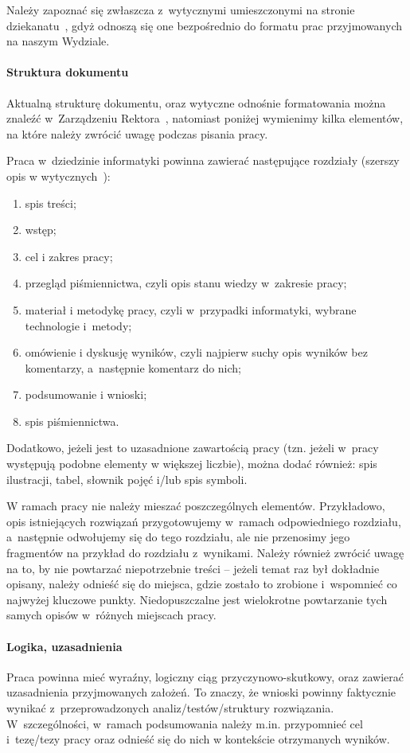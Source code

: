 Należy zapoznać się zwłaszcza z~wytycznymi umieszczonymi na stronie dziekanatu~, gdyż 
odnoszą się one bezpośrednio do formatu prac przyjmowanych na naszym Wydziale. 


\paragraph{Struktura dokumentu}
\label{sec:dod:struktura}
Aktualną strukturę dokumentu, oraz wytyczne odnośnie formatowania można znaleźć w~Zarządzeniu Rektora~, natomiast poniżej wymienimy kilka elementów, na które należy zwrócić uwagę podczas pisania pracy.

Praca w~dziedzinie informatyki powinna zawierać następujące rozdziały (szerszy opis w wytycznych~):\pagebreak[2]
\begin{enumerate}
\item spis treści;  
\item wstęp;  
\item cel i zakres pracy;  
\item przegląd piśmiennictwa, czyli opis stanu wiedzy w~zakresie pracy;
\item materiał i metodykę pracy, czyli w~przypadki informatyki, wybrane technologie i~metody;
\item omówienie i dyskusję wyników, czyli najpierw suchy opis wyników bez komentarzy, a~następnie komentarz do nich;
\item podsumowanie i wnioski; 
\item spis piśmiennictwa. 
\end{enumerate}
Dodatkowo, jeżeli jest to uzasadnione zawartością pracy (tzn. jeżeli w~pracy występują podobne elementy w większej liczbie), można dodać również: spis ilustracji, tabel, słownik pojęć i/lub spis symboli. 

W ramach pracy nie należy mieszać poszczególnych elementów. Przykładowo, opis istniejących rozwiązań przygotowujemy w~ramach odpowiedniego rozdziału, a~następnie odwołujemy się do tego rozdziału, ale nie przenosimy jego fragmentów na przykład do rozdziału z~wynikami. Należy również zwrócić uwagę na to, by nie powtarzać niepotrzebnie treści -- jeżeli temat raz był dokładnie opisany, należy odnieść się do miejsca, gdzie zostało to zrobione i~wspomnieć co najwyżej kluczowe punkty. Niedopuszczalne jest wielokrotne powtarzanie tych samych opisów w~różnych miejscach pracy.


\paragraph{Logika, uzasadnienia}
\label{sec:dod:logika-uzasadnienia}
Praca powinna mieć wyraźny, logiczny ciąg przyczynowo-skutkowy, oraz zawierać uzasadnienia 
przyjmowanych założeń. To znaczy, że wnioski powinny faktycznie wynikać z~przeprowadzonych analiz/testów/struktury rozwiązania. W~szczególności, w~ramach podsumowania należy m.in. przypomnieć cel i~tezę/tezy pracy oraz odnieść 
się do nich w kontekście otrzymanych wyników. 


